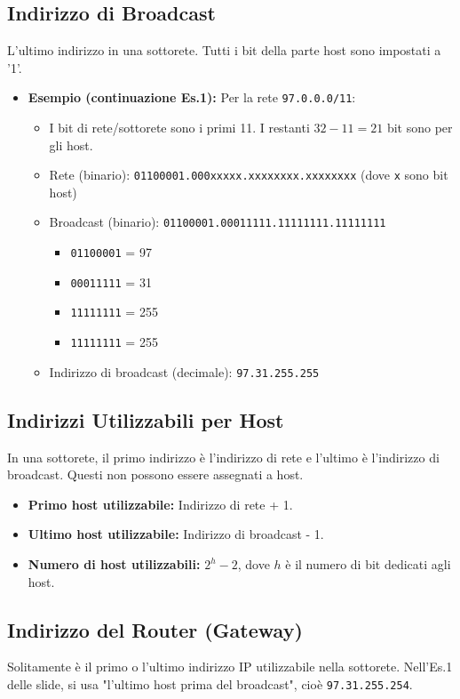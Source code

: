 \subsection{Indirizzo di Broadcast}
L'ultimo indirizzo in una sottorete. Tutti i bit della parte host sono impostati a '1'.
\begin{itemize}
    \item \textbf{Esempio (continuazione Es.1):} Per la rete \texttt{97.0.0.0/11}:
    \begin{itemize}
        \item I bit di rete/sottorete sono i primi 11. I restanti $32 - 11 = 21$ bit sono per gli host.
        \item Rete (binario): \texttt{01100001.000xxxxx.xxxxxxxx.xxxxxxxx} (dove \texttt{x} sono bit host)
        \item Broadcast (binario): \texttt{01100001.00011111.11111111.11111111}
        \begin{itemize}
            \item \texttt{01100001} = 97
            \item \texttt{00011111} = 31
            \item \texttt{11111111} = 255
            \item \texttt{11111111} = 255
        \end{itemize}
        \item Indirizzo di broadcast (decimale): \texttt{97.31.255.255}
    \end{itemize}
\end{itemize}

\subsection{Indirizzi Utilizzabili per Host}
In una sottorete, il primo indirizzo è l'indirizzo di rete e l'ultimo è l'indirizzo di broadcast. Questi non possono essere assegnati a host.
\begin{itemize}
    \item \textbf{Primo host utilizzabile:} Indirizzo di rete + 1.
    \item \textbf{Ultimo host utilizzabile:} Indirizzo di broadcast - 1.
    \item \textbf{Numero di host utilizzabili:} $2^h - 2$, dove $h$ è il numero di bit dedicati agli host.
\end{itemize}

\subsection{Indirizzo del Router (Gateway)}
Solitamente è il primo o l'ultimo indirizzo IP utilizzabile nella sottorete. Nell'Es.1 delle slide, si usa "l'ultimo host prima del broadcast", cioè \texttt{97.31.255.254}.

